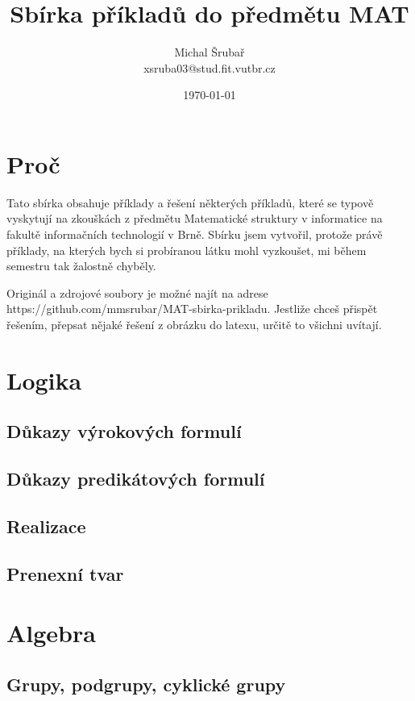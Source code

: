 \documentclass[12pt,a4paper,notitlepage,final]{article}
\author{Michal Šrubař\\xsruba03@stud.fit.vutbr.cz}
\date{\today}
\title{Sbírka příkladů do předmětu MAT}
\begin{document}
\maketitle

\section{Proč} \label{proc}
Tato sbírka obsahuje příklady a řešení některých příkladů, které se typově
vyskytují na zkouškách z předmětu Matematické struktury v
informatice na fakultě informačních technologií v Brně. Sbírku jsem vytvořil,
protože právě příklady, na kterých bych si probíranou látku mohl vyzkoušet, mi
během semestru tak žalostně chyběly. 

Originál a zdrojové soubory je možné najít na adrese
https://github.com/mmsrubar/MAT-sbirka-prikladu. Jestliže chceš přispět řešením,
přepsat nějaké řešení z obrázku do latexu, určitě to všichni uvítají.

\section{Logika} \label{logika}
\subsection{Důkazy výrokových formulí}        
\subsection{Důkazy predikátových formulí}     
\subsection{Realizace}                        
\subsection{Prenexní tvar}                    

\section{Algebra}
\subsection{Grupy, podgrupy, cyklické grupy}  
\end{document}
